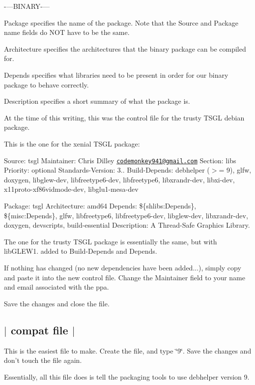 -\/---B\-I\-N\-A\-R\-Y-\/---
\begin{DoxyItemize}
\item Package specifies the name of the package. Note that the Source and Package name fields do N\-O\-T have to be the same.
\item Architecture specifies the architectures that the binary package can be compiled for.
\item Depends specifies what libraries need to be present in order for our binary package to behave correctly.
\item Description specifies a short summary of what the package is.
\end{DoxyItemize}

At the time of this writing, this was the control file for the trusty T\-S\-G\-L debian package.

This is the one for the xenial T\-S\-G\-L package\-:

Source\-: tsgl Maintainer\-: Chris Dilley \href{mailto:codemonkey941@gmail.com}{\tt codemonkey941@gmail.\-com} Section\-: libs Priority\-: optional Standards-\/\-Version\-: 3.. Build-\/\-Depends\-: debhelper ($>$= 9), glfw, doxygen, libglew-\/dev, libfreetype6-\/dev, libfreetype6, libxrandr-\/dev, libxi-\/dev, x11proto-\/xf86vidmode-\/dev, libglu1-\/mesa-\/dev

Package\-: tsgl Architecture\-: amd64 Depends\-: \$\{shlibs\-:Depends\}, \$\{misc\-:Depends\}, glfw, libfreetype6, libfreetype6-\/dev, libglew-\/dev, libxrandr-\/dev, doxygen, devscripts, build-\/essential Description\-: A Thread-\/\-Safe Graphics Library.

The one for the trusty T\-S\-G\-L package is essentially the same, but with lib\-G\-L\-E\-W1. added to Build-\/\-Depends and Depends.

If nothing has changed (no new dependencies have been added...), simply copy and paste it into the new control file. Change the Maintainer field to your name and email associated with the ppa.

Save the changes and close the file. 

 \subsection*{$\vert$ compat file $\vert$ }

This is the easiest file to make. Create the file, and type \char`\"{}9\char`\"{}. Save the changes and don't touch the file again.

Essentially, all this file does is tell the packaging tools to use debhelper version 9.

